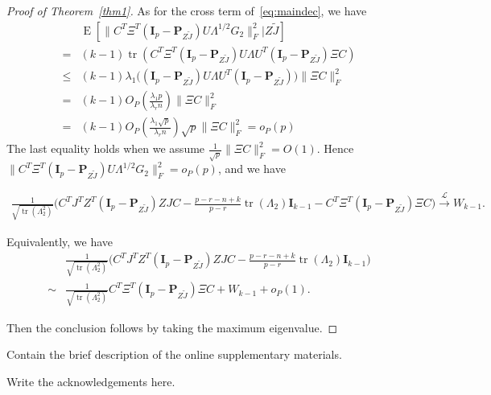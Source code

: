 \documentclass[12pt]{article} %
\DeclareMathOperator{\mytr}{tr}
\DeclareMathOperator{\myE}{E}
\newcommand{\bP}{\mathbf{P}}
\newcommand{\bI}{\mathbf{I}}
\theoremstyle{definition}
\begin{document}
\begin{proof}[\textrm{Proof of Theorem~\ref{thm1}}]
As for the cross term of~\eqref{eq:maindec}, we have
$$
\begin{aligned}
    &\myE [\|C^T \Xi^T (\bI_p -\bP_{Z\tilde{J}})U\Lambda^{1/2}G_2\|_F^2|Z\tilde{J}]\\
    = &
    (k-1)\mytr(C^T \Xi^T (\bI_p -\bP_{Z\tilde{J}})U\Lambda U^T (\bI_p -\bP_{Z\tilde{J}})\Xi C)\\
    \leq &
    (k-1)\lambda_1\big((\bI_p -\bP_{Z\tilde{J}})U\Lambda U^T (\bI_p -\bP_{Z\tilde{J}})\big)\|\Xi C\|^2_F\\
    = &
    (k-1) O_P(\frac{\lambda_1 p}{\lambda_r n})  \|\Xi C\|^2_F\\
    = &
    (k-1) O_P(\frac{\lambda_1 \sqrt{p}}{\lambda_r n}) \sqrt{p}  \|\Xi C\|^2_F=o_P(p)
\end{aligned}
$$
The last equality holds when we assume $\frac{1}{\sqrt{p}}\|\Xi C\|_F^2=O(1)$. Hence $\|C^T \Xi^T (\bI_p -\bP_{Z\tilde{J}})U\Lambda^{1/2}G_2\|_F^2=o_P(p)$, and we have

$$
\begin{aligned}
\frac{1}{\sqrt{\mytr(\Lambda_2^2)}}
    \big( C^TJ^T Z^T(\bI_p-\bP_{Z\tilde J}) ZJC
    -\tfrac{p-r-n+k}{p-r}\mytr(\Lambda_2)\bI_{k-1} -C^T \Xi^T (\bI_p-\bP_{Z\tilde{J}})\Xi C\big)
\xrightarrow{\mathcal{L}} W_{k-1}.
\end{aligned}
$$

    Equivalently, we have
    $$
    \begin{aligned}
        &\frac{1}{\sqrt{\mytr(\Lambda_2^2)}} {\Big(C^TJ^T Z^T(\bI_p-\bP_{Z\tilde J}) ZJC- \frac{p-r-n+k}{p-r}\mytr(\Lambda_2)\bI_{k-1}}\Big)\\
        \sim&
\frac{1}{\sqrt{\mytr(\Lambda_2^2)}} C^T \Xi^T (\bI_p-\bP_{Z\tilde{J}})\Xi C
        +W_{k-1}+o_P(1).
    \end{aligned}
    $$

    Then the conclusion follows by taking the maximum eigenvalue.
\end{proof}

\vskip 14pt

Contain
the brief description of the online supplementary materials.
\par
\vskip 14pt

Write the acknowledgements here.
\par
\end{document}
